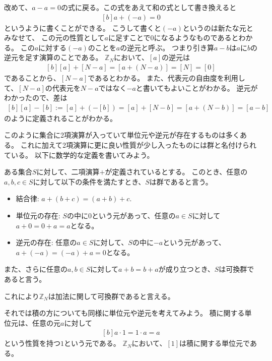 \documentclass[../master.tex]{subfiles}
\begin{document}
改めて、$a-a=0$の式に戻る。この式をあえて和の式として書き換えると
\begin{equation}\begin{aligned}[b]
    a + (-a) = 0
\end{aligned}\end{equation}
というように書くことができる。
こうして書くと$(-a)$というのは新たな元とみなせて、
この元の性質として$a$に足すことで0になるようなものであるとわかる。
この$a$に対する$(-a)$のことを$a$の逆元と呼ぶ。
つまり引き算$a-b$は$a$に$b$の逆元を足す演算のことである。
$\mathbb{Z}_N$において、$[a]$の逆元は
\begin{equation}\begin{aligned}[b]
    [a]+[N-a]=[a+(N-a)]=[N]=[0]
\end{aligned}\end{equation}
であることから、$[N-a]$であるとわかる。
また、代表元の自由度を利用して、$[N-a]$の代表元を$N-a$ではなく$-a$と書いてもよいことがわかる。
逆元がわかったので、差は
\begin{equation}\begin{aligned}[b]
    [a]-[b] := [a]+(-[b]) = [a]+[N-b] = [a+(N-b)] = [a-b]
\end{aligned}\end{equation}
のように定義されることがわかる。

このように集合に2項演算が入っていて単位元や逆元が存在するものは多くある。
これに加えて2項演算に更に良い性質が少し入ったものには群と名付けられている。
以下に数学的な定義を書いてみよう。
\begin{NoteBox}[title=群の定義]{}
    ある集合$S$に対して、二項演算$+$が定義されているとする。
    このとき、任意の$a,b,c\in S$に対して以下の条件を満たすとき、$S$は群であると言う。
    \begin{itemize}
        \item 結合律: $a+(b+c) = (a+b)+c$.
        \item 単位元の存在: $S$の中に$0$という元があって、任意の$a\in S$に対して$a+0=0+a=a$となる。
        \item 逆元の存在: 任意の$a\in S$に対して、$S$の中に$-a$という元があって、$a+(-a)=(-a)+a=0$となる。
    \end{itemize}
    また、さらに任意の$a,b \in S$に対して$a+b=b+a$が成り立つとき、$S$は可換群であると言う。
\end{NoteBox}
これにより$\mathbb{Z}_N$は加法に関して可換群であると言える。

それでは積の方についても同様に単位元や逆元を考えてみよう。
積に関する単位元は、任意の元$a$に対して
\begin{equation}\begin{aligned}[b]
    a\cdot 1 = 1 \cdot a = a
\end{aligned}\end{equation}
という性質を持つ$1$という元である。
$\mathbb{Z}_N$において、$[1]$は積に関する単位元である。
\end{document}
